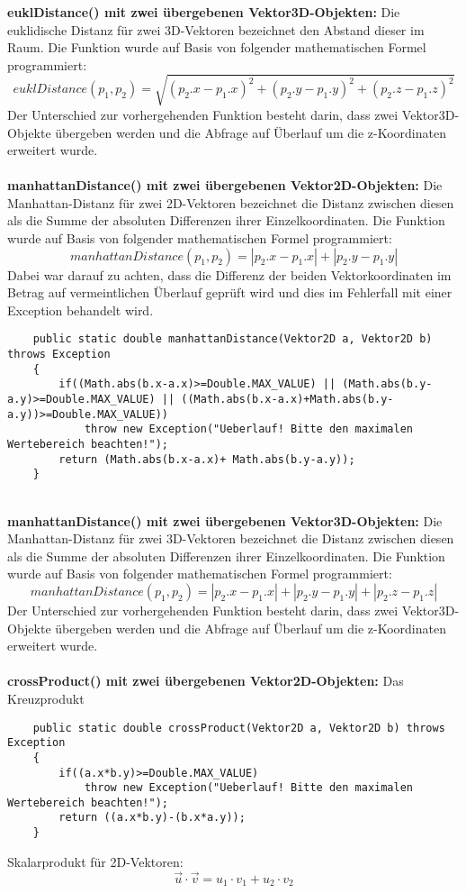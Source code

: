 \documentclass[a4paper,11pt]{scrartcl}
\begin{document}
\textbf{euklDistance() mit zwei übergebenen Vektor3D-Objekten:} Die euklidische Distanz für zwei 3D-Vektoren bezeichnet den Abstand dieser im Raum. Die Funktion wurde auf Basis von folgender mathematischen Formel programmiert:
\[ euklDistance(p_1,p_2) = \sqrt{(p_2.x - p_1.x)^2 + (p_2.y - p_1.y)^2 + (p_2.z - p_1.z)^2} \]
Der Unterschied zur vorhergehenden Funktion besteht darin, dass zwei Vektor3D-Objekte übergeben werden und die Abfrage auf Überlauf um die z-Koordinaten erweitert wurde.\\
\\
\textbf{manhattanDistance() mit zwei übergebenen Vektor2D-Objekten:} Die Manhattan-Distanz für zwei 2D-Vektoren bezeichnet die Distanz zwischen diesen als die Summe der absoluten Differenzen ihrer Einzelkoordinaten. Die Funktion wurde auf Basis von folgender mathematischen Formel programmiert:
\[ manhattanDistance(p_1,p_2) = | p_2.x - p_1.x | + | p_2.y - p_1.y | \]
Dabei war darauf zu achten, dass die Differenz der beiden Vektorkoordinaten im Betrag auf vermeintlichen Überlauf geprüft wird und dies im Fehlerfall mit einer Exception behandelt wird.
\begin{lstlisting}
	public static double manhattanDistance(Vektor2D a, Vektor2D b) throws Exception
	{
		if((Math.abs(b.x-a.x)>=Double.MAX_VALUE) || (Math.abs(b.y-a.y)>=Double.MAX_VALUE) || ((Math.abs(b.x-a.x)+Math.abs(b.y-a.y))>=Double.MAX_VALUE))
			throw new Exception("Ueberlauf! Bitte den maximalen Wertebereich beachten!");
		return (Math.abs(b.x-a.x)+ Math.abs(b.y-a.y));
	}
\end{lstlisting} $\;$ \\
\\
\textbf{manhattanDistance() mit zwei übergebenen Vektor3D-Objekten:} Die Manhattan-Distanz für zwei 3D-Vektoren bezeichnet die Distanz zwischen diesen als die Summe der absoluten Differenzen ihrer Einzelkoordinaten. Die Funktion wurde auf Basis von folgender mathematischen Formel programmiert:
\[ manhattanDistance(p_1,p_2) = | p_2.x - p_1.x | + | p_2.y - p_1.y | + | p_2.z - p_1.z |\]
Der Unterschied zur vorhergehenden Funktion besteht darin, dass zwei Vektor3D-Objekte übergeben werden und die Abfrage auf Überlauf um die z-Koordinaten erweitert wurde.\\
\\
\textbf{crossProduct() mit zwei übergebenen Vektor2D-Objekten:} Das Kreuzprodukt 
\begin{lstlisting}
	public static double crossProduct(Vektor2D a, Vektor2D b) throws Exception
	{
		if((a.x*b.y)>=Double.MAX_VALUE)
			throw new Exception("Ueberlauf! Bitte den maximalen Wertebereich beachten!");
		return ((a.x*b.y)-(b.x*a.y));
	}
\end{lstlisting} $\;$ \\
Skalarprodukt für 2D-Vektoren:
\[ \vec u \cdot \vec v = u_1 \cdot v_1 + u_2 \cdot v_2\]
\end{document}
